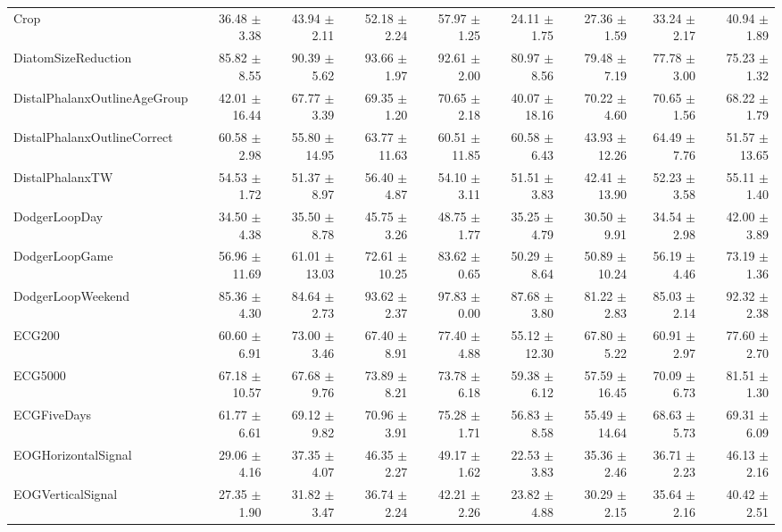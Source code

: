 \begin{landscape}
\begin{longtable}{lrrrrrrrr}
Crop & 36.48 $\pm$ 3.38 & 43.94 $\pm$ 2.11 & 52.18 $\pm$ 2.24 & 57.97 $\pm$ 1.25 & 24.11 $\pm$ 1.75 & 27.36 $\pm$ 1.59 & 33.24 $\pm$ 2.17 & 40.94 $\pm$ 1.89 \\
DiatomSizeReduction & 85.82 $\pm$ 8.55 & 90.39 $\pm$ 5.62 & 93.66 $\pm$ 1.97 & 92.61 $\pm$ 2.00 & 80.97 $\pm$ 8.56 & 79.48 $\pm$ 7.19 & 77.78 $\pm$ 3.00 & 75.23 $\pm$ 1.32 \\
DistalPhalanxOutlineAgeGroup & 42.01 $\pm$ 16.44 & 67.77 $\pm$ 3.39 & 69.35 $\pm$ 1.20 & 70.65 $\pm$ 2.18 & 40.07 $\pm$ 18.16 & 70.22 $\pm$ 4.60 & 70.65 $\pm$ 1.56 & 68.22 $\pm$ 1.79 \\
DistalPhalanxOutlineCorrect & 60.58 $\pm$ 2.98 & 55.80 $\pm$ 14.95 & 63.77 $\pm$ 11.63 & 60.51 $\pm$ 11.85 & 60.58 $\pm$ 6.43 & 43.93 $\pm$ 12.26 & 64.49 $\pm$ 7.76 & 51.57 $\pm$ 13.65 \\
DistalPhalanxTW & 54.53 $\pm$ 1.72 & 51.37 $\pm$ 8.97 & 56.40 $\pm$ 4.87 & 54.10 $\pm$ 3.11 & 51.51 $\pm$ 3.83 & 42.41 $\pm$ 13.90 & 52.23 $\pm$ 3.58 & 55.11 $\pm$ 1.40 \\
DodgerLoopDay & 34.50 $\pm$ 4.38 & 35.50 $\pm$ 8.78 & 45.75 $\pm$ 3.26 & 48.75 $\pm$ 1.77 & 35.25 $\pm$ 4.79 & 30.50 $\pm$ 9.91 & 34.54 $\pm$ 2.98 & 42.00 $\pm$ 3.89 \\
DodgerLoopGame & 56.96 $\pm$ 11.69 & 61.01 $\pm$ 13.03 & 72.61 $\pm$ 10.25 & 83.62 $\pm$ 0.65 & 50.29 $\pm$ 8.64 & 50.89 $\pm$ 10.24 & 56.19 $\pm$ 4.46 & 73.19 $\pm$ 1.36 \\
DodgerLoopWeekend & 85.36 $\pm$ 4.30 & 84.64 $\pm$ 2.73 & 93.62 $\pm$ 2.37 & 97.83 $\pm$ 0.00 & 87.68 $\pm$ 3.80 & 81.22 $\pm$ 2.83 & 85.03 $\pm$ 2.14 & 92.32 $\pm$ 2.38 \\
ECG200 & 60.60 $\pm$ 6.91 & 73.00 $\pm$ 3.46 & 67.40 $\pm$ 8.91 & 77.40 $\pm$ 4.88 & 55.12 $\pm$ 12.30 & 67.80 $\pm$ 5.22 & 60.91 $\pm$ 2.97 & 77.60 $\pm$ 2.70 \\
ECG5000 & 67.18 $\pm$ 10.57 & 67.68 $\pm$ 9.76 & 73.89 $\pm$ 8.21 & 73.78 $\pm$ 6.18 & 59.38 $\pm$ 6.12 & 57.59 $\pm$ 16.45 & 70.09 $\pm$ 6.73 & 81.51 $\pm$ 1.30 \\
ECGFiveDays & 61.77 $\pm$ 6.61 & 69.12 $\pm$ 9.82 & 70.96 $\pm$ 3.91 & 75.28 $\pm$ 1.71 & 56.83 $\pm$ 8.58 & 55.49 $\pm$ 14.64 & 68.63 $\pm$ 5.73 & 69.31 $\pm$ 6.09 \\
EOGHorizontalSignal & 29.06 $\pm$ 4.16 & 37.35 $\pm$ 4.07 & 46.35 $\pm$ 2.27 & 49.17 $\pm$ 1.62 & 22.53 $\pm$ 3.83 & 35.36 $\pm$ 2.46 & 36.71 $\pm$ 2.23 & 46.13 $\pm$ 2.16 \\
EOGVerticalSignal & 27.35 $\pm$ 1.90 & 31.82 $\pm$ 3.47 & 36.74 $\pm$ 2.24 & 42.21 $\pm$ 2.26 & 23.82 $\pm$ 4.88 & 30.29 $\pm$ 2.15 & 35.64 $\pm$ 2.16 & 40.42 $\pm$ 2.51 \\

\end{longtable}
\end{landscape}
